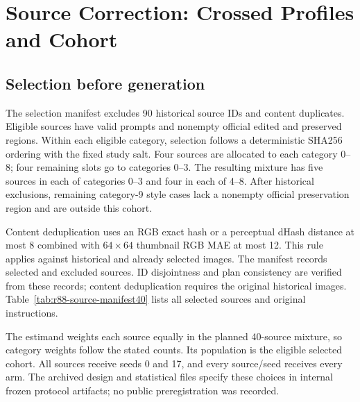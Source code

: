 \documentclass[10pt,doubleanonymous]{ieeeconf}
\begin{document}
\section{Source Correction: Crossed Profiles and Cohort}
\subsection{Selection before generation}
The selection manifest excludes 90 historical source IDs and content duplicates. Eligible sources have valid prompts and nonempty official edited and preserved regions. Within each eligible category, selection follows a deterministic SHA256 ordering with the fixed study salt. Four sources are allocated to each category 0--8; four remaining slots go to categories 0--3. The resulting mixture has five sources in each of categories 0--3 and four in each of 4--8. After historical exclusions, remaining category-9 style cases lack a nonempty official preservation region and are outside this cohort.

Content deduplication uses an RGB exact hash or a perceptual dHash distance at most 8 combined with $64\times64$ thumbnail RGB MAE at most 12. This rule applies against historical and already selected images. The manifest records selected and excluded sources. ID disjointness and plan consistency are verified from these records; content deduplication requires the original historical images. Table~\ref{tab:r88-source-manifest40} lists all selected sources and original instructions.

The estimand weights each source equally in the planned 40-source mixture, so category weights follow the stated counts. Its population is the eligible selected cohort. All sources receive seeds 0 and 17, and every source/seed receives every arm. The archived design and statistical files specify these choices in internal frozen protocol artifacts; no public preregistration was recorded.


\end{document}
